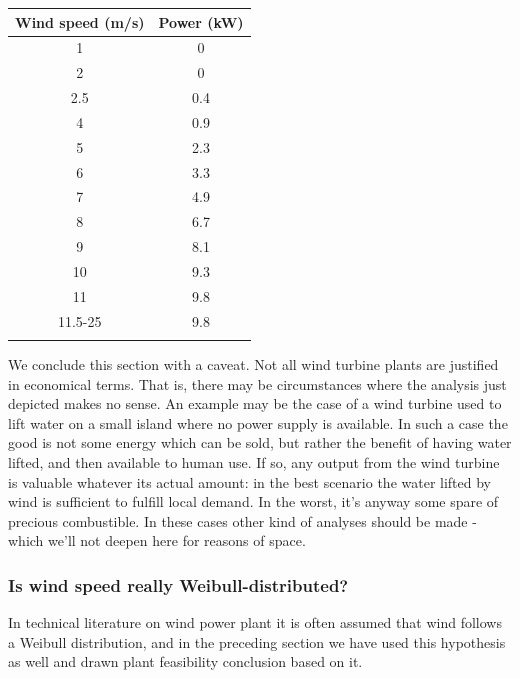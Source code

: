 \documentclass[a4paper,10pt]{book}
\begin{document}
\begin{tabular}{cc}
\hline 
\rule[-2ex]{0pt}{5.5ex} Wind speed (m/s) & Power (kW) \\ 
\hline 
\rule[-2ex]{0pt}{5.5ex} 1 & 0 \\ 
\rule[-2ex]{0pt}{5.5ex} 2 & 0 \\ 
\rule[-2ex]{0pt}{5.5ex} 2.5 & 0.4 \\ 
\rule[-2ex]{0pt}{5.5ex} 4 & 0.9 \\ 
\rule[-2ex]{0pt}{5.5ex} 5 & 2.3 \\ 
\rule[-2ex]{0pt}{5.5ex} 6 & 3.3 \\ 
\rule[-2ex]{0pt}{5.5ex} 7 & 4.9 \\ 
\rule[-2ex]{0pt}{5.5ex} 8 & 6.7 \\ 
\rule[-2ex]{0pt}{5.5ex} 9 & 8.1 \\ 
\rule[-2ex]{0pt}{5.5ex} 10 & 9.3 \\ 
\rule[-2ex]{0pt}{5.5ex} 11 & 9.8 \\ 
\rule[-2ex]{0pt}{5.5ex} 11.5-25 & 9.8 \\ 
\hline 
\rule[-2ex]{0pt}{5.5ex}  &  \\ 
\end{tabular} 

We conclude this section with a caveat. Not all wind turbine plants are justified in economical terms. That is, there may be circumstances where the analysis just depicted makes no sense. An example may be the case of a wind turbine used to lift water on a small island where no power supply is available. In such a case the good is not some energy which can be sold, but rather the benefit of having water lifted, and then available to human use. If so, any output from the wind turbine is valuable whatever its actual amount: in the best scenario the water lifted by wind is sufficient to fulfill local demand. In the worst, it's anyway some spare of precious combustible. In these cases other kind of analyses should be made - which we'll not deepen here for reasons of space.


\subsubsection{Is wind speed really Weibull-distributed?}

In technical literature on wind power plant it is often assumed that wind follows a Weibull distribution, and in the preceding section we have used this hypothesis as well and drawn plant feasibility conclusion based on it.
\end{document}
